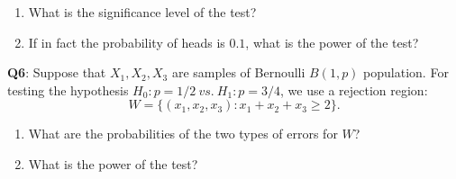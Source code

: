 \documentclass[]{article}
\providecommand{\tightlist}{%
  \setlength{\itemsep}{0pt}\setlength{\parskip}{0pt}}
\begin{document}
\begin{enumerate}
\def\labelenumi{\arabic{enumi}.}
\tightlist
\item
  What is the significance level of the test?
\item
  If in fact the probability of heads is \(0.1\), what is the power of
  the test?
\end{enumerate}

\textbf{Q6}: Suppose that \(X_1,X_2,X_3\) are samples of Bernoulli
\(B(1,p)\) population. For testing the hypothesis
\(H_0:p=1/2\ vs.\ H_1:p=3/4\), we use a rejection region:
\[W=\{(x_1,x_2,x_3):x_1+x_2+x_3\ge 2\}.\]

\begin{enumerate}
\def\labelenumi{\arabic{enumi}.}
\tightlist
\item
  What are the probabilities of the two types of errors for \(W\)?
\item
  What is the power of the test?
\end{enumerate}
\end{document}
